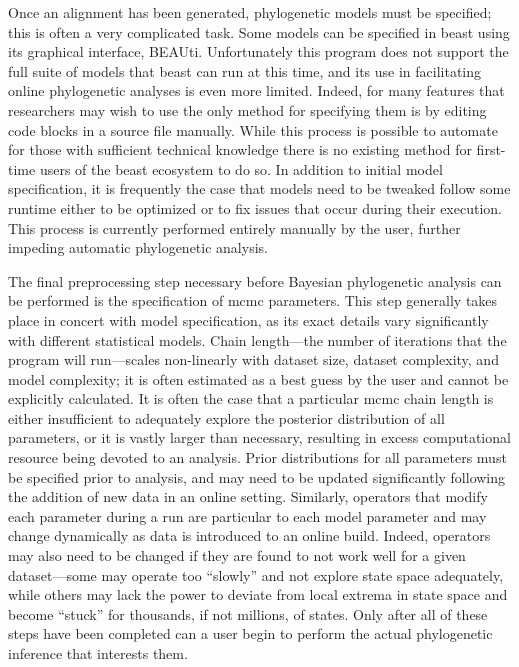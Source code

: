 Once an alignment has been generated, phylogenetic models must be specified; this is often a very complicated task.
Some models can be specified in \gls{beast} using its graphical interface, BEAUti.
Unfortunately this program does not support the full suite of models that \gls{beast} can run at this time, and its use in facilitating online phylogenetic analyses is even more limited.
Indeed, for many features that researchers may wish to use the only method for specifying them is by editing code blocks in a source file manually.
While this process is possible to automate for those with sufficient technical knowledge there is no existing method for first-time users of the \gls{beast} ecosystem to do so.
In addition to initial model specification, it is frequently the case that models need to be tweaked follow some runtime either to be optimized or to fix issues that occur during their execution.
This process is currently performed entirely manually by the user, further impeding automatic phylogenetic analysis.

The final preprocessing step necessary before Bayesian phylogenetic analysis can be performed is the specification of \gls{mcmc} parameters.
This step generally takes place in concert with model specification, as its exact details vary significantly with different statistical models.
Chain length---the number of iterations that the program will run---scales non-linearly with dataset size, dataset complexity, and model complexity; it is often estimated as a best guess by the user and cannot be explicitly calculated.
It is often the case that a particular \gls{mcmc} chain length is either insufficient to adequately explore the posterior distribution of all parameters, or it is vastly larger than necessary, resulting in excess computational resource being devoted to an analysis.
Prior distributions for all parameters must be specified prior to analysis, and may need to be updated significantly following the addition of new data in an online setting.
Similarly, operators that modify each parameter during a run are particular to each model parameter and may change dynamically as data is introduced to an online build.
Indeed, operators may also need to be changed if they are found to not work well for a given dataset---some may operate too ``slowly'' and not explore state space adequately, while others may lack the power to deviate from local extrema in state space and become ``stuck'' for thousands, if not millions, of states.
Only after all of these steps have been completed can a user begin to perform the actual phylogenetic inference that interests them.


